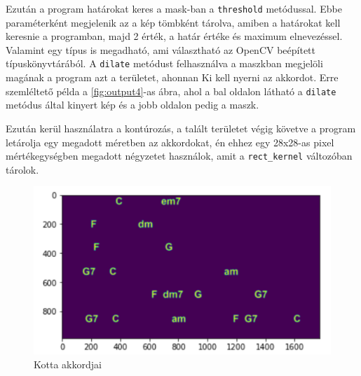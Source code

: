 \par
Ezután a program határokat keres a mask-ban a \texttt{threshold} metódussal. Ebbe paraméterként megjelenik az a kép tömbként tárolva, amiben a határokat kell keresnie a programban, majd 2 érték, a határ értéke és maximum elnevezéssel. Valamint egy típus is megadható, ami választható az OpenCV beépített típuskönyvtárából. A \texttt{dilate} metódust felhasználva a maszkban megjelöli magának a program azt a területet, ahonnan Ki kell nyerni az akkordot. Erre szemléltető példa a \ref{fig:output4}-as ábra, ahol a bal oldalon látható a \texttt{dilate} metódus által kinyert kép és a jobb oldalon pedig a maszk.
\par
Ezután kerül használatra a kontúrozás, a talált területet végig követve a program letárolja egy megadott méretben az akkordokat, én ehhez egy 28x28-as pixel mértékegységben megadott négyzetet használok, amit a \texttt{rect\_kernel} változóban tárolok.

\begin{figure}[h]
	\includegraphics[scale=0.5]{images/output_justchords.png}
	\caption{Kotta akkordjai}
	\label{fig:output2}
\end{figure}


